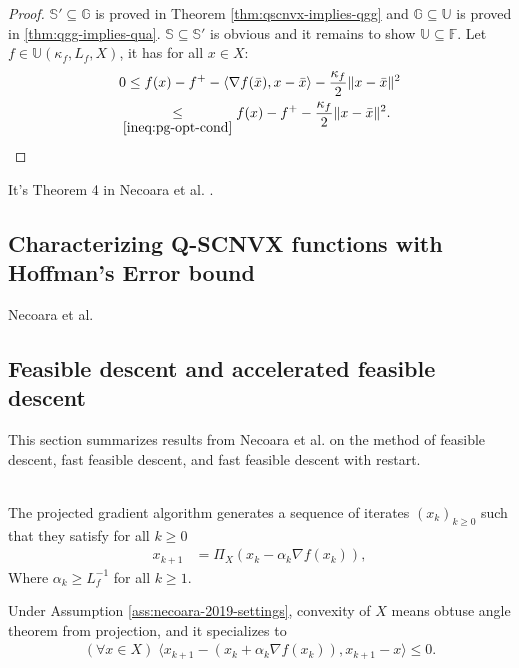 \documentclass[12pt]{report}
\begin{document}
            \begin{proof}
                $\mathbb S' \subseteq \mathbb G$ is proved in Theorem \ref{thm:qscnvx-implies-qgg} and $\mathbb G \subseteq \mathbb U$ is proved in \ref{thm:qgg-implies-qua}. 
                $\mathbb S\subseteq \mathbb S'$ is obvious and it remains to show $\mathbb U \subseteq \mathbb F$. 
                Let $f\in \mathbb U(\kappa_f, L_f, X)$, it has for all $x \in X$: 
                \begin{align*}
                    0 &\le f(x) - f^+ - \langle \nabla f(\bar x), x - \bar x\rangle - \frac{\kappa_f}{2}\Vert x - \bar x\Vert^2
                    \\
                    &\hspace{-0.5em}\underset{\eqref{ineq:pg-opt-cond}}{\le} 
                    f(x) - f^+ - \frac{\kappa_f}{2}\Vert x - \bar x\Vert^2. 
                \end{align*}
            \end{proof}
            \begin{remark}
                It's Theorem 4 in Necoara et al. \cite{necoara_linear_2019}.
            \end{remark}

        \subsection{Characterizing Q-SCNVX functions with Hoffman's Error bound}
            Necoara et al. \cite{necoara_linear_2019} 
            
        \subsection{Feasible descent and accelerated feasible descent}
            This section summarizes results from Necoara et al. on the method of feasible descent, fast feasible descent, and fast feasible descent with restart. 
            \begin{definition}\label{def:projg-alg}\;\\
                The projected gradient algorithm generates a sequence of iterates $(x_k)_{k \ge 0}$ such that they satisfy for all $k \ge 0$
                \begin{align*}
                    x_{k + 1} &= \Pi_X(x_k - \alpha_k \nabla f(x_k)), 
                \end{align*}
                Where $\alpha_k \ge L_f^{-1}$ for all $k \ge 1$. 
            \end{definition}
            Under Assumption \ref{ass:necoara-2019-settings}, convexity of $X$ means obtuse angle theorem from projection, and it specializes to 
            \begin{align}\label{ineq:projg-variational-ineq}
                (\forall x \in X)\; \langle x_{k + 1} - (x_k + \alpha_k \nabla f(x_k)), x_{k + 1} - x\rangle \le 0. 
            \end{align}
\end{document}
